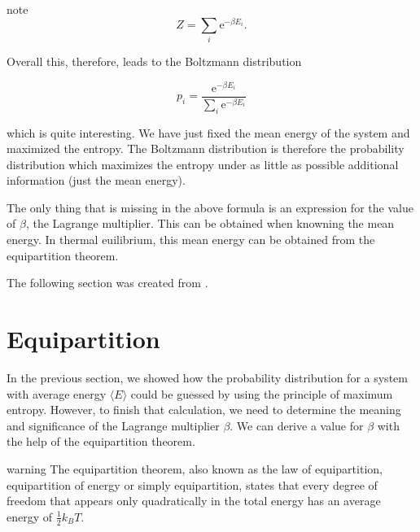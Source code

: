 \documentclass[letterpaper,10pt,english]{sphinxmanual}
\begin{document}
\begin{sphinxadmonition}{note}{}
\sphinxAtStartPar
\begin{equation}
Z=\sum_{i} \mathrm{e}^{-\beta E_{i}}.
\end{equation}

\sphinxAtStartPar
Overall this, therefore, leads to the Boltzmann distribution

\sphinxAtStartPar
\begin{equation}
p_{i}=\frac{\mathrm{e}^{-\beta E_{i}}}{\sum_{i} \mathrm{e}^{-\beta E_{i}}}
\end{equation}

\sphinxAtStartPar
which is quite interesting. We have just fixed the mean energy of the system and maximized the entropy. The Boltzmann distribution is therefore the probability distribution which maximizes the entropy under as little as possible additional information (just the mean energy).

\sphinxAtStartPar
The only thing that is missing in the above formula is an expression for the value of \(\beta\), the Lagrange multiplier. This can be obtained when knowning the mean energy. In thermal euilibrium, this mean energy can be obtained from the equipartition theorem.
\end{sphinxadmonition}



\sphinxAtStartPar
The following section was created from .


\chapter{Equipartition}
\label{\detokenize{notebooks/L3/1_Equipartition:Equipartition}}\label{\detokenize{notebooks/L3/1_Equipartition::doc}}
\sphinxAtStartPar
In the previous section, we showed how the probability distribution for a system with average energy \(\langle E \rangle\) could be guessed by using the principle of maximum entropy. However, to finish that calculation, we need to determine the meaning and significance of the Lagrange multiplier \(\beta\). We can derive a value for \(\beta\) with the help of the equipartition theorem.

\begin{sphinxadmonition}{warning}{}\unskip
\sphinxAtStartPar
The equipartition theorem, also known as the law of equipartition, equipartition of energy or simply equipartition, states that every degree of freedom that appears only quadratically in the total energy has an average energy of \(\frac{1}{2}k_B T\).
\end{sphinxadmonition}
\end{document}
